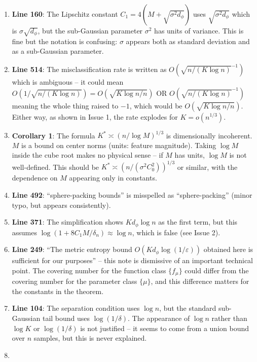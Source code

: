 \documentclass[
  12pt,
]{ctexart}
\begin{document}
\begin{enumerate}
\def\labelenumi{\arabic{enumi}.}
\item
  \textbf{Line 160}: The Lipschitz constant
  \(C_1 = 4(M + \sqrt{\sigma^2 d_\phi})\) uses
  \(\sqrt{\sigma^2 d_\phi}\) which is \(\sigma\sqrt{d_\phi}\), but the
  sub-Gaussian parameter \(\sigma^2\) has units of variance. This is
  fine but the notation is confusing: \(\sigma\) appears both as
  standard deviation and as a sub-Gaussian parameter.
\item
  \textbf{Line 514}: The misclassification rate is written as
  \(O(\sqrt{n/(K \log n)}^{-1})\) which is ambiguous -- it could mean
  \(O(1/\sqrt{n/(K \log n)}) = O(\sqrt{K \log n / n})\) OR
  \(O(\sqrt{n/(K \log n)}^{-1})\) meaning the whole thing raised to
  \(-1\), which would be \(O(\sqrt{K \log n / n})\). Either way, as
  shown in Issue 1, the rate explodes for \(K = o(n^{1/3})\).
\item
  \textbf{Corollary 1}: The formula \(K^* \asymp (n / \log M)^{1/3}\) is
  dimensionally incoherent. \(M\) is a bound on center norms (units:
  feature magnitude). Taking \(\log M\) inside the cube root makes no
  physical sense -- if \(M\) has units, \(\log M\) is not well-defined.
  This should be \(K^* \asymp (n / (\sigma^2 C_0^2))^{1/3}\) or similar,
  with the dependence on \(M\) appearing only in constants.
\item
  \textbf{Line 492}: ``sphere-packing bounds'' is misspelled as
  ``sphere-packing'' (minor typo, but appears consistently).
\item
  \textbf{Line 371}: The simplification shows \(K d_\phi \log n\) as the
  first term, but this assumes
  \(\log(1 + 8C_1 M/\delta_n) \approx \log n\), which is false (see
  Issue 2).
\item
  \textbf{Line 249}: ``The metric entropy bound
  \(O(K d_\phi \log(1/\varepsilon))\) obtained here is sufficient for
  our purposes'' -- this note is dismissive of an important technical
  point. The covering number for the function class \(\{f_\mu\}\) could
  differ from the covering number for the parameter class \(\{\mu\}\),
  and this difference matters for the constants in the theorem.
\item
  \textbf{Line 104}: The separation condition uses \(\log n\), but the
  standard sub-Gaussian tail bound uses \(\log(1/\delta)\). The
  appearance of \(\log n\) rather than \(\log K\) or \(\log(1/\delta)\)
  is not justified -- it seems to come from a union bound over \(n\)
  samples, but this is never explained.
\item

\end{enumerate}
\end{document}
